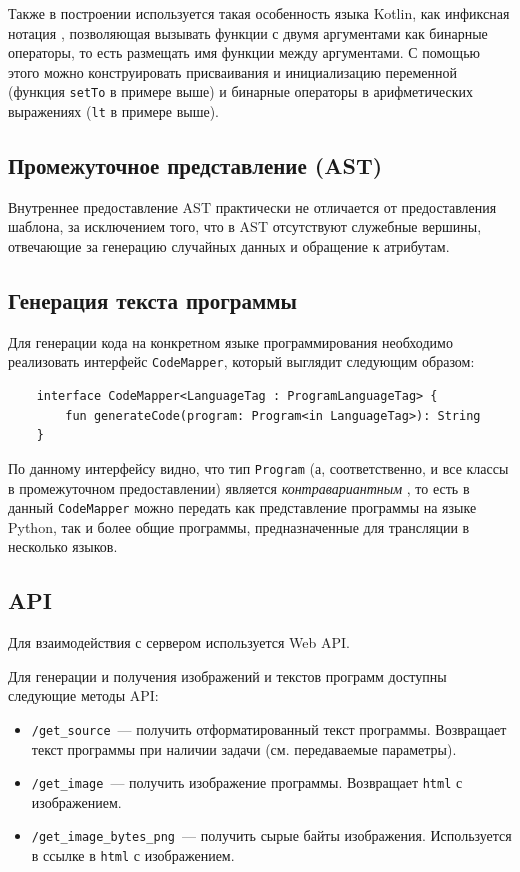 Также в построении используется такая особенность языка Kotlin, как инфиксная
нотация \cite{kotlin-infix}, позволяющая вызывать функции с двумя аргументами как
бинарные операторы, то есть размещать имя функции между аргументами. С помощью
этого можно конструировать присваивания и инициализацию переменной (функция
\texttt{setTo} в примере выше) и бинарные операторы в арифметических выражениях
(\texttt{lt} в примере выше).
\subsection{Промежуточное представление (AST)}
Внутреннее предоставление AST практически не отличается от предоставления шаблона,
за исключением того, что в AST отсутствуют служебные вершины, отвечающие за
генерацию случайных данных и обращение к атрибутам.

\subsection{Генерация текста программы}
Для генерации кода на конкретном языке программирования необходимо реализовать
интерфейс \texttt{CodeMapper}, который выглядит следующим образом:
\begin{verbatim}
    interface CodeMapper<LanguageTag : ProgramLanguageTag> {
        fun generateCode(program: Program<in LanguageTag>): String
    }
\end{verbatim}
По данному интерфейсу видно, что тип \texttt{Program} (а, соответственно, и
все классы в промежуточном предоставлении) является \textit{контравариантным}
\cite{kotlin-variance}, то есть в данный \texttt{CodeMapper} можно передать как
представление программы на языке Python, так и более общие программы,
предназначенные для трансляции в несколько языков.

\subsection{API}
Для взаимодействия с сервером используется Web API.

Для генерации и получения изображений и текстов программ доступны следующие методы API:

\begin{itemize}
    \item \texttt{/get\_source}~--- получить отформатированный текст программы.
          Возвращает текст программы при наличии задачи (см. передаваемые параметры).
    \item \texttt{/get\_image}~--- получить изображение программы. Возвращает \texttt{html} с изображением.
    \item \texttt{/get\_image\_bytes\_png}~--- получить сырые байты изображения. Используется в ссылке
          в \texttt{html} с изображением.
\end{itemize}

